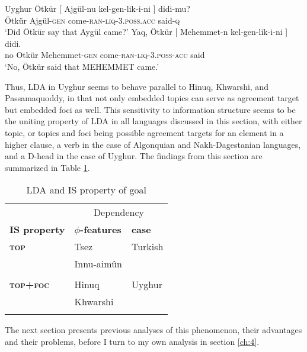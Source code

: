 \documentclass[output=paper
,modfonts
,nonflat]{langsci/langscibook}
\begin{document}
\begin{exe}
\ex Uyghur \citep[][10]{Asarina_Hartman2011a}
	\xlist
		\gll Ötkür [ Ajgül-nu kel-gen-lik-i-ni ] didi-mu?\\
			 Ötkür {} Ajgül-\textsc{gen} come-\textsc{ran-liq-3.poss.acc} {} said-\textsc{q}\\
		\glt `Did Ötkür say that Aygül came?'
	 \label{ex:uyg_cf}
		\gll Yaq, Ötkür [ Mehemmet-n kel-gen-lik-i-ni ] didi.\\
			 no Otkür {} Mehemmet-\textsc{gen} come-\textsc{ran-liq-3.poss-acc} {} said\\
		\glt `No, Ötkür said that MEHEMMET came.'
	\endxlist
\end{exe}
Thus, LDA in Uyghur seems to behave parallel to Hinuq, Khwarshi, and Passamaquoddy, in that not only embedded topics can serve as agreement target but embedded foci as well. This sensitivity to information structure seems to be the uniting property of LDA in all languages discussed in this section, with either topic, or topics and foci being possible agreement targets for an element in a higher clause, a verb in the case of Algonquian and Nakh-Dagestanian languages, and a D-head in the case of Uyghur. The findings from this section are summarized in Table \ref{table:LDA}.
\begin{table}
	\caption{LDA and IS property of goal}
	\label{table:LDA}
	\begin{tabular}{lll} 
		\lsptoprule
			& \multicolumn{2}{c}{Dependency} \\
		\cmidrule(r){2-3}
		\textbf{IS property}    & \textbf{$ \phi $-features} & \textbf{case}\\
		\midrule
		\textbf{\textsc{top}}      & Tsez \citep{Polinsky_Potsdam2001} & Turkish \citep{Sener2008} \\
			& Innu-aim\^{u}n  & \\
			& \citep{Branigan_MacKenzie2002} & \\
		\textbf{\textsc{top+foc}} & Hinuq \citep{Forker2012}     & Uyghur \\
			& Khwarshi \citep{Khalilova2009}   & \citep{Asarina_Hartman2011a}\\
		\lspbottomrule
	\end{tabular}
\end{table}

{\noindent}The next section presents previous analyses of this phenomenon, their advantages and their problems, before I turn to my own analysis in section \ref{ch:4}.
\end{document}
